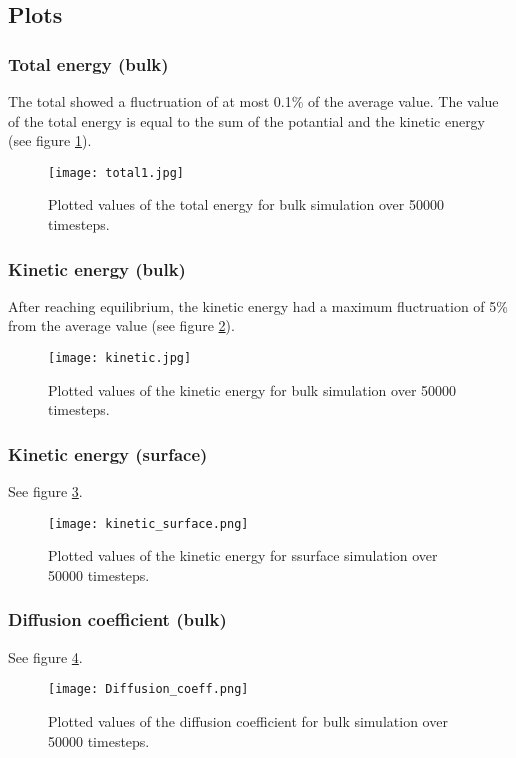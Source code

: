 \subsection{Plots}
\subsubsection{Total energy (bulk)}
The total showed a fluctruation of at most 0.1\% of the average value. The value of the total energy is equal to the sum of the potantial and the kinetic energy (see figure  \ref{totale}).
\begin{figure}[H]
	\centering
	\texttt{[image: total1.jpg]}
	\caption{Plotted values of the total energy for bulk simulation over 50000 timesteps.}
	\label{totale}
\end{figure}

\subsubsection{Kinetic energy (bulk)}
After reaching equilibrium, the kinetic energy had a maximum fluctruation of 5\% from the average value (see figure \ref{kinetic}).
\begin{figure}[H]
	\centering
	\texttt{[image: kinetic.jpg]}
	\caption{Plotted values of the kinetic energy for bulk simulation over 50000 timesteps.}
	\label{kinetic}
\end{figure}

\subsubsection{Kinetic energy (surface)}
See figure \ref{kineticsf}.
\begin{figure}[H]
	\centering
	\texttt{[image: kinetic\_surface.png]}
	\caption{Plotted values of the kinetic energy for ssurface simulation over 50000 timesteps.}
	\label{kineticsf}
\end{figure}

\subsubsection{Diffusion coefficient (bulk)}
See figure \ref{diff}.
\begin{figure}[H]
	\centering
	\texttt{[image: Diffusion\_coeff.png]}
	\caption{Plotted values of the diffusion coefficient for bulk simulation over 50000 timesteps.}
	\label{diff}
\end{figure}

